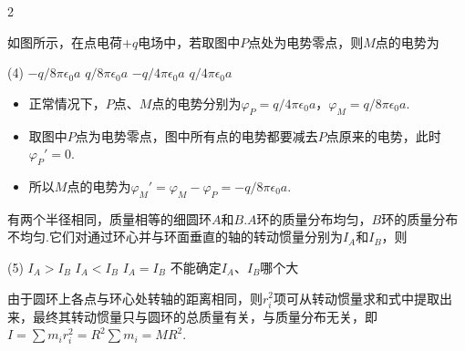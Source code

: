 \begin{paracol}{2}
    \begin{problem}
        如图所示，在点电荷$+q$电场中，若取图中$P$点处为电势零点，则$M$点的电势为
        \begin{tasks}(4)
            \task[\true] $-q/8\pi\epsilon_0a$
            \task $q/8\pi\epsilon_0a$
            \task $-q/4\pi\epsilon_0a$
            \task $q/4\pi\epsilon_0a$
        \end{tasks}
    \end{problem}
    \switchcolumn\vspace*{\fill}\centering
    \vspace*{\fill}
\end{paracol}
\begin{solution}\leavevmode
    \begin{itemize}
        \item 正常情况下，$P$点、$M$点的电势分别为$\varphi_P=q/4\pi\epsilon_0a$，$\varphi_M=q/8\pi\epsilon_0a$.
        \item 取图中$P$点为电势零点，图中所有点的电势都要减去$P$点原来的电势，此时$\varphi_P'=0$.
        \item 所以$M$点的电势为$\varphi_M'=\varphi_M-\varphi_P=-q/8\pi\epsilon_0a$.
    \end{itemize}
\end{solution}

\begin{problem}
有两个半径相同，质量相等的细圆环$A$和$B$.$A$环的质量分布均匀，$B$环的质量分布不均匀.它们对通过环心并与环面垂直的轴的转动惯量分别为$I_A$和$I_B$，则
\begin{tasks}(5)
\task $I_A>I_B$
\task $I_A<I_B$
\task[\true] $I_A=I_B$
\task* 不能确定$I_A$、$I_B$哪个大
\end{tasks}
\end{problem}
\begin{solution}
    由于圆环上各点与环心处转轴的距离相同，则$r_i^2$项可从转动惯量求和式中提取出来，最终其转动惯量只与圆环的总质量有关，与质量分布无关，即$I=\sum{m_ir_i^2}=R^2\sum{m_i}=MR^2$.
\end{solution}

